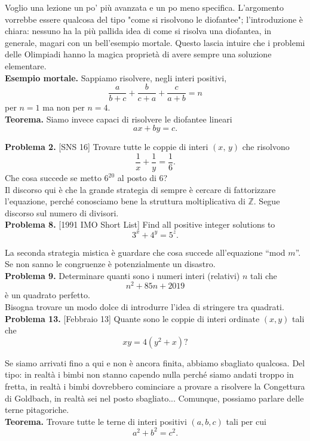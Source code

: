 \documentclass[a4paper]{article}
\theoremstyle{remark}
\theoremstyle{definition}
\begin{document}
\begin{multicols}{2}
	\textsf{Voglio una lezione un po' più avanzata e un po meno specifica. L'argomento vorrebbe essere qualcosa del tipo "come si risolvono le diofantee"; l'introduzione è chiara: nessuno ha la più pallida idea di come si risolva una diofantea, in generale, magari con un bell'esempio mortale. Questo lascia intuire che i problemi delle Olimpiadi hanno la magica proprietà di avere sempre una soluzione elementare.}\\
	
	\textbf{Esempio mortale.} Sappiamo risolvere, negli interi positivi, 
	\[ \frac{a}{b+c} + \frac{b}{c+a} + \frac{c}{a + b} = n \]
	per $ n= 1 $ ma non per $ n=4 $.\\

	\textbf{Teorema.} Siamo invece capaci di risolvere le diofantee lineari
	\[ ax+by = c. \]
	
	\textbf{Problema 2.} [SNS 16] Trovare tutte le coppie di interi $ (x, \, y) $ che risolvono
	$$  \dfrac{1}{x} + \dfrac{1}{y} = \dfrac{1}{6}.  $$
	Che cosa succede se metto $ 6^{20} $ al posto di $ 6 $?\\
	
	\textsf{Il discorso qui è che la grande strategia di sempre è cercare di fattorizzare l'equazione, perché conosciamo bene la struttura moltiplicativa di $ \mathbb{Z} $. Segue discorso sul numero di divisori.} \\
	
	\textbf{Problema 8.} [1991 IMO Short List] Find all positive integer solutions to $$  3^x + 4^y = 5^z.  $$
	
	\textsf{La seconda strategia mistica è guardare che cosa succede all'equazione ``mod $ m $''. Se non sanno le congruenze è potenzialmente un disastro.}\\
	
	\textbf{Problema 9.} Determinare quanti sono i numeri interi (relativi) $ n $ tali che
	\[n^2 + 85n + 2019\]
	\`e un quadrato perfetto.\\
	
	\textsf{Bisogna trovare un modo dolce di introdurre l'idea di stringere tra quadrati.} \\
	
	\textbf{Problema 13.} [Febbraio 13] Quante sono le coppie di interi ordinate $ (x, y) $ tali che \[ xy = 4(y^2 + x)? \]
	
	\textsf{Se siamo arrivati fino a qui e non è ancora finita, abbiamo sbagliato qualcosa. Del tipo: in realtà i bimbi non stanno capendo nulla perché siamo andati troppo in fretta, in realtà i bimbi dovrebbero cominciare a provare a risolvere la Congettura di Goldbach, in realtà sei nel posto sbagliato... Comunque, possiamo parlare delle terne pitagoriche.}\\
	
	\textbf{Teorema.} Trovare tutte le terne di interi positivi $ (a, b, c) $ tali per cui
	\[ a^2 + b^2 = c^2. \]
	
	
	
	
	
	
	
\end{multicols}
\end{document}
